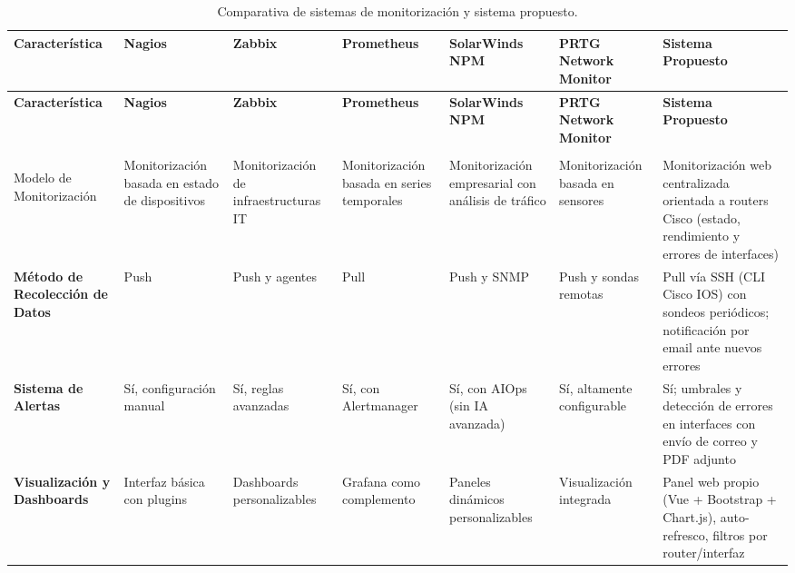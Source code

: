 \begin{landscape} %
\setlength{\tabcolsep}{6pt}
\renewcommand{\arraystretch}{1.2}
\small

\begin{xltabular}{\linewidth}{>{\bfseries}p{4.2cm} *{6}{Y}}
\caption{Comparativa de sistemas de monitorización y sistema propuesto.}\label{tab:comparativa}\\
\toprule
\textbf{Característica} & \textbf{Nagios} & \textbf{Zabbix} & \textbf{Prometheus} &
\textbf{SolarWinds NPM} & \textbf{PRTG Network Monitor} & \textbf{Sistema Propuesto}\\
\midrule
\endfirsthead

\toprule
\textbf{Característica} & \textbf{Nagios} & \textbf{Zabbix} & \textbf{Prometheus} &
\textbf{SolarWinds NPM} & \textbf{PRTG Network Monitor} & \textbf{Sistema Propuesto}\\
\midrule
\endhead

\midrule
{}\\
\endfoot

\bottomrule
\endlastfoot

Modelo de Monitorización
& Monitorización basada en estado de dispositivos
& Monitorización de infraestructuras IT
& Monitorización basada en series temporales
& Monitorización empresarial con análisis de tráfico
& Monitorización basada en sensores
& Monitorización web centralizada orientada a routers Cisco (estado, rendimiento y errores de interfaces)
\\

Método de Recolección de Datos
& Push
& Push y agentes
& Pull
& Push y SNMP
& Push y sondas remotas
& Pull vía SSH (CLI Cisco IOS) con sondeos periódicos; notificación por email ante nuevos errores
\\

Sistema de Alertas
& Sí, configuración manual
& Sí, reglas avanzadas
& Sí, con Alertmanager
& Sí, con AIOps (sin IA avanzada)
& Sí, altamente configurable
& Sí; umbrales y detección de errores en interfaces con envío de correo y PDF adjunto
\\

Visualización y Dashboards
& Interfaz básica con plugins
& Dashboards personalizables
& Grafana como complemento
& Paneles dinámicos personalizables
& Visualización integrada
& Panel web propio (Vue + Bootstrap + Chart.js), auto-refresco, filtros por router/interfaz
\\


\end{xltabular}
\end{landscape}
